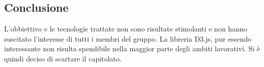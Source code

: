 \subsection{Conclusione}
L'obbiettivo e le tecnologie trattate non sono risultate stimolanti e non hanno suscitato l'interesse di tutti i membri del gruppo. La libreria D3.js, pur essendo interessante non risulta spendibile nella maggior parte degli ambiti lavorativi. Si è quindi deciso di scartare il capitolato.
